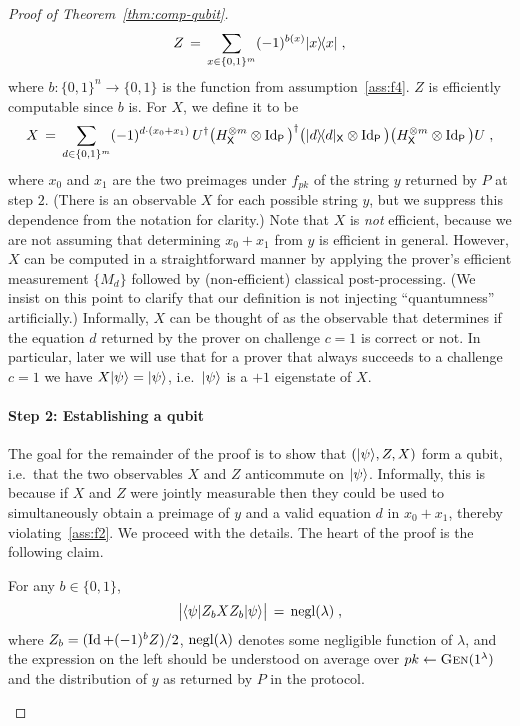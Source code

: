 \begin{proof}[Proof of Theorem~\ref{thm:comp-qubit}]
\begin{equation}
Z \,=\, \sum_{x\in\{0,1\}^m} (-1)^{b(x)} |x\rangle\!\langle x|\;,
\end{equation}
where $b:\{0,1\}^n\to\{0,1\}$ is the function from assumption~\ref{ass:f4}. 
$Z$ is efficiently computable since $b$ is. For $X$, we define it to be 
\begin{equation}\label{eq:comp-qubit-proof-1b}
 X\,=\, \sum_{d\in\{0,1\}^m} (-1)^{d\cdot(x_0+x_1)}\,  U^\dagger \big(H^{\otimes m}_{\textsf{X}}\otimes \mathop{\rm Id}\nolimits_{\textsf{P}}\big)^\dagger \big(|d\rangle\!\langle d|_{\textsf{X}} \otimes \mathop{\rm Id}\nolimits_{\textsf{P}} \big)\big(H^{\otimes m}_{\textsf{X}}\otimes \mathop{\rm Id}\nolimits_{\textsf{P}}\big) U\;,
\end{equation}
where $x_0$ and $x_1$ are the two preimages under $f_{pk}$ of the string $y$ returned by $P$ at step $2$. (There is an observable $X$ for each possible string $y$, but we suppress this dependence from the notation for clarity.) Note that $X$ is \emph{not} efficient, because we are not assuming that determining $x_0+x_1$ from $y$ is efficient in general. However, $X$ can be computed in a straightforward manner by applying the prover's efficient measurement $\{M_d\}$ followed by (non-efficient) classical post-processing. (We insist on this point to clarify that our definition is not injecting ``quantumness'' artificially.) Informally, $X$ can be thought of as the observable that determines if the equation $d$ returned by the prover on challenge $c=1$ is correct or not. In particular, later we will use that for a prover that always succeeds to a challenge $c=1$ we have $X|\psi\rangle = |\psi\rangle$, i.e.\ $|\psi\rangle$ is a $+1$ eigenstate of $X$. 

\paragraph{Step 2: Establishing a qubit} The goal for the remainder of the proof is to show that $(|\psi\rangle,Z,X)$ form a qubit, i.e.\ that the two observables $X$ and $Z$ anticommute on $|\psi\rangle$. Informally, this is because if $X$ and $Z$ were jointly measurable then they could be used to simultaneously obtain a preimage of $y$ and a valid equation $d$ in $x_0+ x_1$, thereby violating~\ref{ass:f2}. We proceed with the details.  
The heart of the proof is the following claim. 

\begin{claim}\label{claim:comp-qubit-1}
For any $b\in \{0,1\}$, 
\[\big| \langle\psi| Z_b X Z_b |\psi\rangle \big| \,=\, \operatorname{negl}(\lambda) \;,\]
where $Z_b = (\mathop{\rm Id}\nolimits + (-1)^b Z)/2$, $\operatorname{negl}(\lambda)$ denotes some negligible function of $\lambda$, and the expression on the left should be understood on average over $pk\leftarrow \textsc{Gen}(1^\lambda)$ and the distribution of $y$ as returned by $P$ in the protocol. 
\end{claim}


\end{proof}
